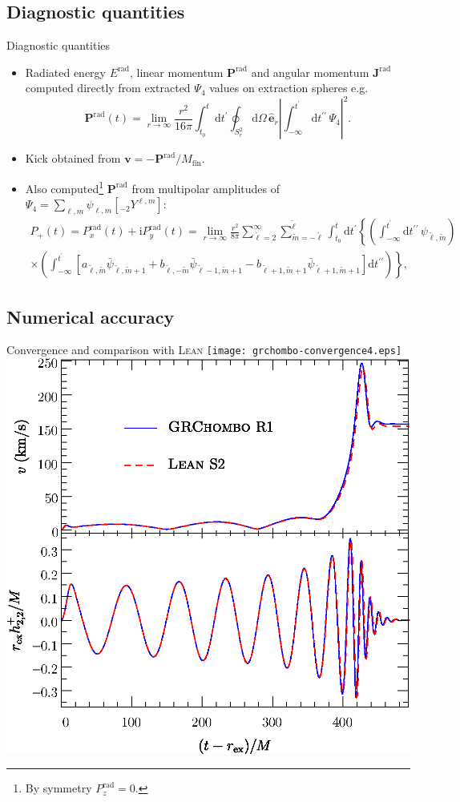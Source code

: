 \documentclass[smaller,aspectratio=169]{beamer}
\newcommand{\rad}{\mathrm{rad}}
\newcommand{\tl}{\tilde{\ell}}
\newcommand{\tm}{\tilde{m}}
\newcommand{\rmd}{\mathrm{d}}
\begin{document}
\subsection{Diagnostic quantities}
\begin{frame}{Diagnostic quantities}
	\begin{itemize}
		\item 
			Radiated energy $E^{\rad}$, 
			linear momentum $\mathbf{P}^{\rad}$ and 
			angular momentum $\mathbf{J}^{\rad}$ computed \alert{directly} 
			from extracted $\Psi_4$ values on extraction spheres e.g.
			\begin{equation}
				\mathbf{P}^{\rad}(t) = \lim_{r\to\infty}\frac{r^2}{16\pi}
				\int_{t_0}^t\rmd t^\prime\oint_{S^2_r}\rmd\Omega\,
				\hat{\mathbf{e}}_r\left|\int_{-\infty}^{t^\prime}\rmd t^{\prime\prime}\,
				\Psi_4\right|^2.
				\label{eq:Prad}
			\end{equation}
		\item
			Kick obtained from $\mathbf{v}=-\mathbf{P}^{\rad}/M_{\text{fin}}$.
		\item
			Also computed\footnote{By symmetry $P^\rad_z=0$.} 
			$\mathbf{P}^{\rad}$
			from multipolar amplitudes of $\Psi_4=\sum_{\ell,m}\psi_{\ell,m}\left[{}_{-2}Y^{\ell,m}\right]$:
			\begin{multline}
				P_+(t) = P^\rad_x(t) + \mathrm{i}P^\rad_y(t)
				 = \lim_{r\to\infty}\frac{r^2}{8\pi}\sum_{\tl=2}^{\infty}
				 \sum_{\tm=-\tl}^{\tl}\int_{t_0}^t\rmd t^{\prime}
				\left\{\left(\int^{t^\prime}_{-\infty}\rmd t^{\prime\prime}\, 
				\psi_{\tl,\tm}\right)\right.\\
				\left.\times\left(\int_{-\infty}^{t^\prime} 
				\left[a_{\tl,\tm}\bar{\psi}_{\tl,\tm+1}+ 
				b_{\tl,-\tm}\bar{\psi}_{\tl-1,\tm+1}-
				b_{\tl+1,\tm+1}\bar{\psi}_{\tl+1,\tm+1}\right]
				\rmd t^{\prime\prime}\right)\right\},
				\label{eq:P+rad}
			\end{multline}
			\vspace{0.5 em}
	\end{itemize}

\end{frame}

\subsection{Numerical accuracy}
\begin{frame}{Convergence and comparison with \textsc{Lean}}
    \texttt{[image: grchombo-convergence4.eps]}
    \hfill
    \includegraphics[width=0.45\linewidth]{grchombo-lean-comparison3.eps}
\end{frame}
\end{document}
